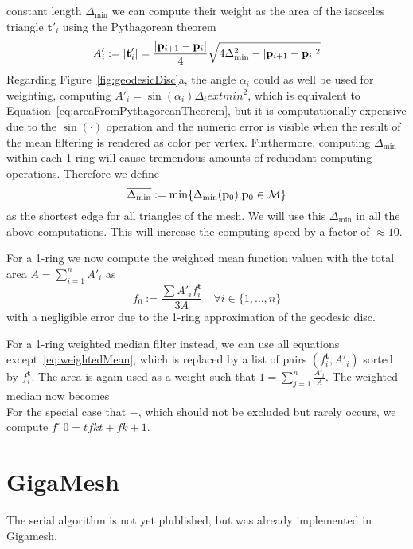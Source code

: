 constant length $\Delta_\text{min}$ we can compute their weight as the area of the 
isosceles triangle $\mathbf{t}'_i$ using the Pythagorean theorem
\begin{equation}
	A'_i := |\mathbf{t}'_i| = \frac{|\mathbf{p}_{i+1} - \mathbf{p}_i|}{4}
	\sqrt{4\Delta_\text{min}^2 - |\mathbf{p}_{i+1} - \mathbf{p}_i|^2}
	\label{eq:areaFromPythagoreanTheorem}
\end{equation}
Regarding Figure~\ref{fig:geodesicDisc}a, the angle $\alpha_i$ could as well be 
used for weighting, computing $A'_i = \sin(\alpha_i)\Delta_text{min}^2$, which is 
equivalent to Equation~\ref{eq:areaFromPythagoreanTheorem}, but it 
is computationally expensive due to the $\sin(\cdot)$ operation and the numeric error 
is visible when the result of the mean filtering is rendered as color per 
vertex. Furthermore, computing $\Delta_\text{min}$ within each 1-ring will cause 
tremendous amounts of redundant computing operations. Therefore we define 
\begin{equation}
	\overline{\Delta_\text{min}} := \min\{\Delta_\text{min}(\mathbf{p}_0) | 
	\mathbf{p}_0 \in \mathcal{M}\}
\end{equation} 
as the shortest edge for all triangles of the mesh. We will use this 
$\overline{\Delta_\text{min}}$ in all the above computations. This will increase the 
computing speed by a factor of $\approx 10$. 

For a 1-ring we now compute the weighted mean function valuen with the total area
$A = \displaystyle\sum_{i=1}^nA'_i$ as
\begin{equation}
	\bar{f}_0 := \frac{\sum A'_if_i^\mathbf{t}}{3A} \quad \forall i \in \{1,\ldots,n\}
	\label{eq:weightedMean}
\end{equation}
with a negligible error due to the 1-ring approximation of the geodesic 
disc.

For a 1-ring weighted median filter instead, we can use all equations 
except~\ref{eq:weightedMean}, which is replaced by a list of pairs $(f_i^\mathbf{t}, 
A'_i)$ sorted by $f_i^\mathbf{t}$. The area is again used as a weight such that 
$1 = \displaystyle\sum_{j=1}^n\frac{A'_i}{A}$. The weighted median now becomes
\begin{equation}
\end{equation}
For the special case that $-$, which should not be excluded but rarely occurs, 
we compute $f  ̃ 0 =tf k t + f k+1$.~\cite[s.~3.2]{Mara17}



\section{GigaMesh}
The serial algorithm is not yet plublished, but was already implemented in Gigamesh.



